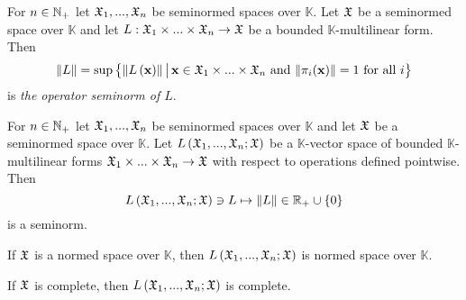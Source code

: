 \begin{definition}
   For $n \in {\mathbb N}_+$ let ${\mathfrak X}_1,...,{\mathfrak X}_n$ be seminormed spaces over $\mathbb{K}$. Let ${\mathfrak X}$ be a seminormed space over $\mathbb{K}$ and let $L:{\mathfrak X}_1\times ... \times {\mathfrak X}_n\rightarrow {\mathfrak X}$ be a bounded $\mathbb{K}$-multilinear form. Then
   $$\lVert L\rVert = \sup \big\{\lVert L\left(\mathbf{x}\right)\rVert\,\big|\,\mathbf{x}\in {\mathfrak X}_1\times ...\times {\mathfrak X}_n\mbox{ and }\lVert\pi_i(\mathbf{x})\rVert = 1\mbox{ for all }i \big\}$$
   is \textit{the operator seminorm of $L$}.
\end{definition}

\begin{theorem}\label{theorem:seminormed_space_of_bounded_multilinear_maps}
   For $n \in {\mathbb N}_+$ let ${\mathfrak X}_1,...,{\mathfrak X}_n$ be seminormed spaces over $\mathbb{K}$ and let ${\mathfrak X}$ be a seminormed space over $\mathbb{K}$. Let $L\left({\mathfrak X}_1,...,{\mathfrak X}_n;{\mathfrak X}\right)$ be a $\mathbb{K}$-vector space of bounded $\mathbb{K}$-multilinear forms ${\mathfrak X}_1\times ... \times {\mathfrak X}_n\rightarrow {\mathfrak X}$ with respect to operations defined pointwise. Then 
   $$L\left({\mathfrak X}_1,...,{\mathfrak X}_n;{\mathfrak X}\right) \ni L\mapsto \lVert L\rVert\in {\mathbb R}_+\cup \{0\}$$
   is a seminorm.

   If ${\mathfrak X}$ is a normed space over $\mathbb{K}$, then $L\left({\mathfrak X}_1,...,{\mathfrak X}_n;{\mathfrak X}\right)$ is normed space over $\mathbb{K}$.
   
   If ${\mathfrak X}$ is complete, then $L\left({\mathfrak X}_1,...,{\mathfrak X}_n;{\mathfrak X}\right)$ is complete.
   \end{theorem}
